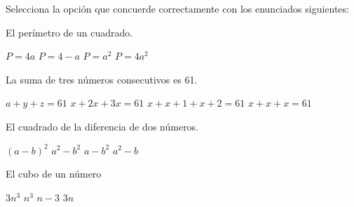 Selecciona la opción que concuerde correctamente con los enunciados siguientes:
\begin{multicols}{2}
    \begin{parts}

        El perímetro de un cuadrado.

        \begin{choices}
            \choice $P = 4a$
            \choice $P = 4 - a$
            \CorrectChoice $P = a^2$
            \choice $P = 4a^2$
        \end{choices}

        La suma de tres números consecutivos es 61.

        \begin{choices}
            \choice $a + y + z = 61$
            \choice $x + 2x + 3x = 61$
            \CorrectChoice $x + x + 1 + x + 2 = 61$
            \choice $x + x + x = 61$
        \end{choices}

        El cuadrado de la diferencia de dos números.

        \begin{choices}
            \CorrectChoice $(a - b)^2$
            \choice $a^2 - b^2$
            \choice $a - b^2$
            \choice $a^2 - b$
        \end{choices}

        El cubo de un número

        \begin{choices}
            \choice $3n^3$
            \CorrectChoice $n^3$
            \choice $n - 3$
            \choice $3n$
        \end{choices}

    \end{parts}
\end{multicols}